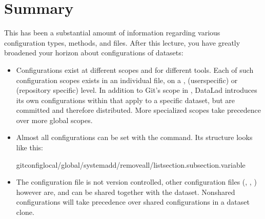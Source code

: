 \section{Summary}
\label{\detokenize{basics/101-125-summary:summary}}\label{\detokenize{basics/101-125-summary:summary-config}}\label{\detokenize{basics/101-125-summary::doc}}
\sphinxAtStartPar
This has been a substantial amount of information regarding various configuration
types, methods, and files. After this lecture, you have greatly broadened
your horizon about configurations of datasets:
\begin{itemize}
\item {} 
\sphinxAtStartPar
Configurations exist at different scopes and for different tools. Each
of such configuration scopes exists in an individual file, on a ,
 (user\sphinxhyphen{}specific) or  (repository specific) level. In addition
to Git’s  scope in , DataLad introduces its own configurations within
 that apply to a specific dataset, but are committed and
therefore distributed. More specialized scopes take precedence over more global scopes.

\item {} 
\sphinxAtStartPar
Almost all configurations can be set with the  command.
Its structure looks like this:

\begin{sphinxVerbatim}[commandchars=\\\{\}]
gitconfig\PYGZhy{}\PYGZhy{}local/\PYGZhy{}\PYGZhy{}global/\PYGZhy{}\PYGZhy{}system\PYGZhy{}\PYGZhy{}add/remove\PYGZhy{}all/\PYGZhy{}\PYGZhy{}listsection.\PYG{o}{[}subsection.\PYG{o}{]}variable
\end{sphinxVerbatim}

\item {} 
\sphinxAtStartPar
The  configuration file is not version controlled, other
configuration files (, , )
however are, and can be shared together with the dataset. Non\sphinxhyphen{}shared configurations
will take precedence over shared configurations in a dataset clone.


\end{itemize}
